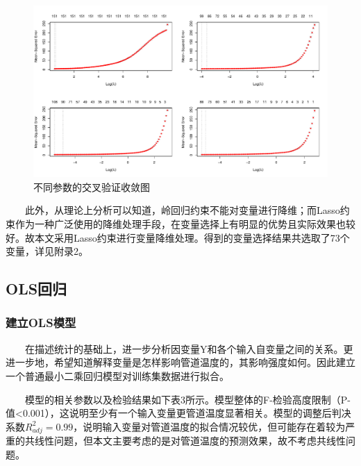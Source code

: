 \documentclass[
]{article}
\begin{document}
\begin{figure}

{\centering \includegraphics{TJRJCP_DuXingx_202105_files/figure-latex/unnamed-chunk-12-1} 

}

\caption{不同参数的交叉验证收敛图}\label{fig:unnamed-chunk-12}
\end{figure}

  此外，从理论上分析可以知道，岭回归约束不能对变量进行降维；而Lasso约束作为一种广泛使用的降维处理手段，在变量选择上有明显的优势且实际效果也较好。故本文采用Lasso约束进行变量降维处理。得到的变量选择结果共选取了73个变量，详见附录2。

\hypertarget{olsux56deux5f52}{%
\subsection{OLS回归}\label{olsux56deux5f52}}

\hypertarget{ux5efaux7acbolsux6a21ux578b}{%
\subsubsection{建立OLS模型}\label{ux5efaux7acbolsux6a21ux578b}}

  在描述统计的基础上，进一步分析因变量Y和各个输入自变量之间的关系。更进一步地，希望知道解释变量是怎样影响管道温度的，其影响强度如何。因此建立一个普通最小二乘回归模型对训练集数据进行拟合。

  模型的相关参数以及检验结果如下表3所示。模型整体的F-检验高度限制（P-值\textless0.001），这说明至少有一个输入变量更管道温度显著相关。模型的调整后判决系数\(R^2_{adj}=0.99\)，说明输入变量对管道温度的拟合情况较优，但可能存在着较为严重的共线性问题，但本文主要考虑的是对管道温度的预测效果，故不考虑共线性问题。
\end{document}
